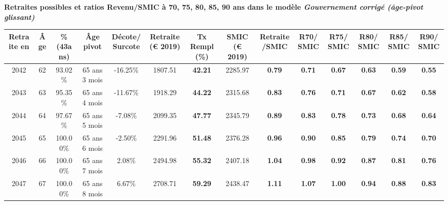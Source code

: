  \vspace{0.1cm} 
{\bf \noindent Retraites possibles et ratios Revenu/SMIC à 70, 75, 80, 85, 90 ans dans le modèle \emph{Gouvernement corrigé (âge-pivot glissant)}}  
 
\begin{adjustbox}{max width=\textwidth} 
\begin{tabular}[htb]{|c|c||c|c|c||c|c||c|c||c|c|c|c|c|} 
\hline 
 Retraite en &  Âge &  \%(43ans) &  Âge pivot &  Décote/Surcote &  Retraite (\euro{} 2019) &  Tx Rempl(\%) &  SMIC (\euro{} 2019) &  Retraite/SMIC &  R70/SMIC &  R75/SMIC &  R80/SMIC &  R85/SMIC &  R90/SMIC \\ 
\hline \hline 
 2042 &  62 &  93.02\% &  65 ans 3 mois &  -16.25\% &  1807.51 &  {\bf 42.21} &  2285.97 &  {\bf {\color{red} 0.79}} &  {\bf {\color{red} 0.71}} &  {\bf {\color{red} 0.67}} &  {\bf {\color{red} 0.63}} &  {\bf {\color{red} 0.59}} &  {\bf {\color{red} 0.55}} \\ 
\hline 
 2043 &  63 &  95.35\% &  65 ans 4 mois &  -11.67\% &  1918.29 &  {\bf 44.22} &  2315.68 &  {\bf {\color{red} 0.83}} &  {\bf {\color{red} 0.76}} &  {\bf {\color{red} 0.71}} &  {\bf {\color{red} 0.67}} &  {\bf {\color{red} 0.62}} &  {\bf {\color{red} 0.58}} \\ 
\hline 
 2044 &  64 &  97.67\% &  65 ans 5 mois &  -7.08\% &  2099.35 &  {\bf 47.77} &  2345.79 &  {\bf {\color{red} 0.89}} &  {\bf {\color{red} 0.83}} &  {\bf {\color{red} 0.78}} &  {\bf {\color{red} 0.73}} &  {\bf {\color{red} 0.68}} &  {\bf {\color{red} 0.64}} \\ 
\hline 
 2045 &  65 &  100.00\% &  65 ans 6 mois &  -2.50\% &  2291.96 &  {\bf 51.48} &  2376.28 &  {\bf {\color{red} 0.96}} &  {\bf {\color{red} 0.90}} &  {\bf {\color{red} 0.85}} &  {\bf {\color{red} 0.79}} &  {\bf {\color{red} 0.74}} &  {\bf {\color{red} 0.70}} \\ 
\hline 
 2046 &  66 &  100.00\% &  65 ans 7 mois &  2.08\% &  2494.98 &  {\bf 55.32} &  2407.18 &  {\bf 1.04} &  {\bf {\color{red} 0.98}} &  {\bf {\color{red} 0.92}} &  {\bf {\color{red} 0.87}} &  {\bf {\color{red} 0.81}} &  {\bf {\color{red} 0.76}} \\ 
\hline 
 2047 &  67 &  100.00\% &  65 ans 8 mois &  6.67\% &  2708.71 &  {\bf 59.29} &  2438.47 &  {\bf 1.11} &  {\bf 1.07} &  {\bf 1.00} &  {\bf {\color{red} 0.94}} &  {\bf {\color{red} 0.88}} &  {\bf {\color{red} 0.83}} \\ 
\hline 
\hline 
\end{tabular} 
\end{adjustbox} 
 

